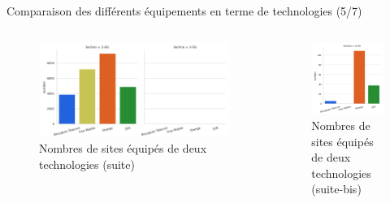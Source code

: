 \begin{frame}{Comparaison des différents équipements en terme de technologies (5/7)}
    \begin{columns}
        \begin{column}{0.65\textwidth}
            \begin{figure}
                \includegraphics[height=0.4\paperheight]{images/barplots/3-xG.png}
                \caption{\label{fig:3-xG}Nombres de sites équipés de deux technologies (suite)}
            \end{figure}
        \end{column}
            
        \begin{column}{0.35\textwidth}
            \begin{figure}
                \includegraphics[height=0.4\paperheight]{images/barplots/4-5G.png}
                \caption{\label{fig:4-5G}Nombres de sites équipés de deux technologies (suite-bis)}
            \end{figure}
        \end{column}
    \end{columns} 
\end{frame}

